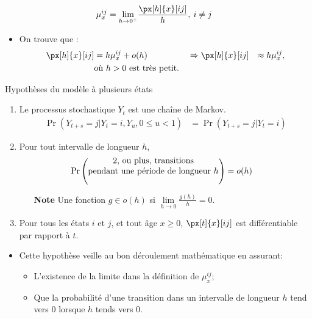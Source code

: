 \documentclass[10pt, french]{article}
\begin{document}
\begin{multicols*}{2}
\begin{description}
		\begin{align*}
		\mu_{x}^{ij}
		&=	\limz{h}{0^{+}} \frac{\px[h]{x}[ij]}{h}, \: i \neq j
		\end{align*}
		\begin{itemize}[leftmargin = *]
		\item	On trouve que :
			\begin{align*}
			\px[h]{x}[ij]	&=	h\mu_{x}^{ij} + o(h)		&
			&\Rightarrow		\px[h]{x}[ij]	&\approx	h\mu_{x}^{ij}, \\
			&\text{où } h > 0 \text{ est très petit.}
			\end{align*}
		\end{itemize}
\end{description}

\begin{rappel}{Hypothèses du modèle à plusieurs états} 
\begin{enumerate}
	\item	Le processus stochastique $Y_{t}$ est une chaîne de Markov.
		\begin{align*}
		\Pr(Y_{t + s} = j | Y_{t} = i, Y_{u}, 0 \leq u < 1) &= \Pr(Y_{t + s} = j | Y_{t} = i)
		\end{align*}
	\item	Pour tout intervalle de longueur $h$,
		\begin{align*}
		\Pr\left( \shortstack{2, ou plus, transitions\\ pendant une période de longueur $h$} \right)	&=	o(h)	
		\end{align*}
		\begin{itemize}[leftmargin = *]
		\item[\textbf{Note}]	Une fonction $g \in o(h)$ si $\underset{h \rightarrow 0}{\lim} \frac{g(h)}{h} = 0$.
		\end{itemize}
	\item	Pour tous les états $i$ et $j$, et tout âge $x \geq 0$, $\px[t]{x}[ij]$ est différentiable par rapport à $t$.
\end{enumerate}
\begin{itemize}[leftmargin = *]
\item	Cette hypothèse veille au bon déroulement mathématique en assurant:
	\begin{itemize}[leftmargin = *]
	\item	L'existence de la limite dans la définition de $\mu_{x}^{ij}$;
	\item	Que la probabilité d'une transition dans un intervalle de longueur $h$ tend vers 0 lorsque $h$ tends vers 0.
	\end{itemize}
\end{itemize}
\end{rappel}


\end{multicols*}
\end{document}
